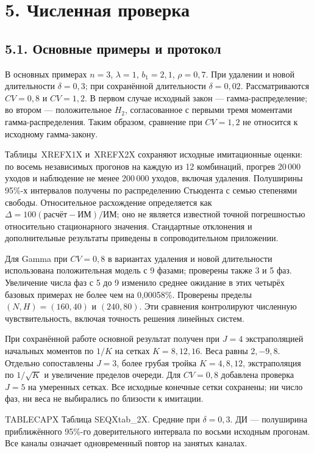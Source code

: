 \section*{5. Численная проверка}
\subsection*{5.1. Основные примеры и протокол}
В основных примерах \(n=3\), \(\lambda=1\), \(b_1=2{,}1\), \(\rho=0{,}7\). При удалении и новой длительности \(\delta=0{,}3\); при сохранённой длительности \(\delta=0{,}02\). Рассматриваются \(CV=0{,}8\) и \(CV=1{,}2\). В первом случае исходный закон --- гамма-распределение; во втором --- положительное \(H_2\), согласованное с первыми тремя моментами гамма-распределения. Таким образом, сравнение при \(CV=1{,}2\) не относится к исходному гамма-закону.

Таблицы~XREFX1X и~XREFX2X сохраняют исходные имитационные оценки: по восемь независимых прогонов на каждую из 12 комбинаций, прогрев 20\,000 уходов и наблюдение не менее 200\,000 уходов, включая удаления. Полуширины 95\%-х интервалов получены по распределению Стьюдента с семью степенями свободы. Относительное расхождение определяется как \(\Delta=100(\text{расчёт}-\text{ИМ})/\text{ИМ}\); оно не является известной точной погрешностью относительно стационарного значения. Стандартные отклонения и дополнительные результаты приведены в сопроводительном приложении.

Для Gamma при \(CV=0{,}8\) в вариантах удаления и новой длительности использована положительная модель с 9 фазами; проверены также 3 и 5 фаз. Увеличение числа фаз с 5 до 9 изменило среднее ожидание в этих четырёх базовых примерах не более чем на 0{,}00058\%. Проверены пределы \((N,H)=(160,40)\) и \((240,80)\). Эти сравнения контролируют численную чувствительность, включая точность решения линейных систем.

При сохранённой работе основной результат получен при \(J=4\) экстраполяцией начальных моментов по \(1/K\) на сетках \(K=8,12,16\). Веса равны \(2,-9,8\). Отдельно сопоставлены \(J=3\), более грубая тройка \(K=4,8,12\), экстраполяция по \(1/\sqrt K\) и увеличение пределов очереди. Для \(CV=0{,}8\) добавлена проверка \(J=5\) на умеренных сетках. Все исходные конечные сетки сохранены; ни число фаз, ни веса не выбирались по близости к имитации.

\noindent TABLECAPX Таблица SEQXtab_2X. Средние при $\delta=0{,}3$. ДИ --- полуширина приближённого 95\%-го доверительного интервала по восьми исходным прогонам. Все каналы означает одновременный повтор на занятых каналах.\par

